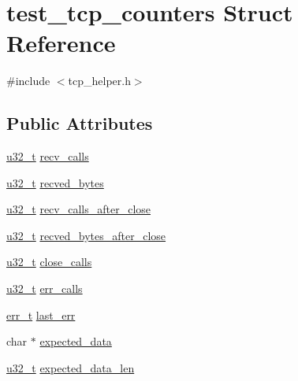 \hypertarget{structtest__tcp__counters}{}\section{test\+\_\+tcp\+\_\+counters Struct Reference}
\label{structtest__tcp__counters}


{\ttfamily \#include $<$tcp\+\_\+helper.\+h$>$}

\subsection*{Public Attributes}
\begin{DoxyCompactItemize}
\item 
\hyperlink{group__compiler__abstraction_ga4c14294869aceba3ef9d4c0c302d0f33}{u32\+\_\+t} \hyperlink{structtest__tcp__counters_af31bbabce2e91642b6e39fee0b0a1ac4}{recv\+\_\+calls}
\item 
\hyperlink{group__compiler__abstraction_ga4c14294869aceba3ef9d4c0c302d0f33}{u32\+\_\+t} \hyperlink{structtest__tcp__counters_a1ac42e63bd4e3ad41bff07d61bfb1741}{recved\+\_\+bytes}
\item 
\hyperlink{group__compiler__abstraction_ga4c14294869aceba3ef9d4c0c302d0f33}{u32\+\_\+t} \hyperlink{structtest__tcp__counters_af23337c680f3c9c867541d8807a042e1}{recv\+\_\+calls\+\_\+after\+\_\+close}
\item 
\hyperlink{group__compiler__abstraction_ga4c14294869aceba3ef9d4c0c302d0f33}{u32\+\_\+t} \hyperlink{structtest__tcp__counters_add2b14593471262f5efab948cb3006c6}{recved\+\_\+bytes\+\_\+after\+\_\+close}
\item 
\hyperlink{group__compiler__abstraction_ga4c14294869aceba3ef9d4c0c302d0f33}{u32\+\_\+t} \hyperlink{structtest__tcp__counters_ae93b852a5dd9062c42e93e757e0004bf}{close\+\_\+calls}
\item 
\hyperlink{group__compiler__abstraction_ga4c14294869aceba3ef9d4c0c302d0f33}{u32\+\_\+t} \hyperlink{structtest__tcp__counters_a580a799125c6487fc79bc75202856a24}{err\+\_\+calls}
\item 
\hyperlink{group__infrastructure__errors_gaf02d9da80fd66b4f986d2c53d7231ddb}{err\+\_\+t} \hyperlink{structtest__tcp__counters_ac63af9f4d7d64d9f38fd165469e16741}{last\+\_\+err}
\item 
char $\ast$ \hyperlink{structtest__tcp__counters_a4264a04793dccd307a8d7504fe0e4c21}{expected\+\_\+data}
\item 
\hyperlink{group__compiler__abstraction_ga4c14294869aceba3ef9d4c0c302d0f33}{u32\+\_\+t} \hyperlink{structtest__tcp__counters_ac179b79c73be64b57abe7ed62c693324}{expected\+\_\+data\+\_\+len}
\end{DoxyCompactItemize}


